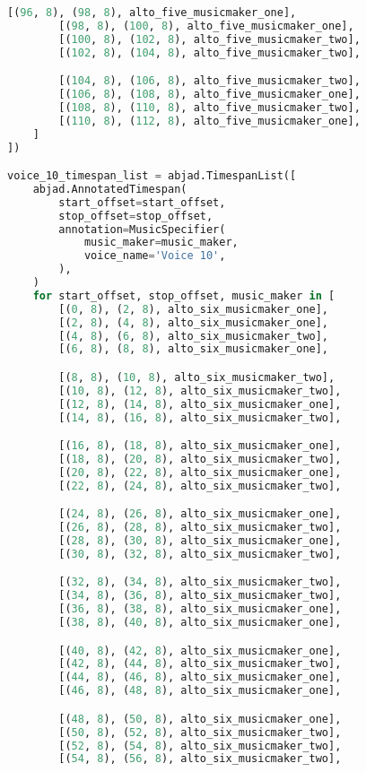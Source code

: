 \begin{lstlisting}[language=Python, caption=Invocation Source Code]
        [(96, 8), (98, 8), alto_five_musicmaker_one],
        [(98, 8), (100, 8), alto_five_musicmaker_one],
        [(100, 8), (102, 8), alto_five_musicmaker_two],
        [(102, 8), (104, 8), alto_five_musicmaker_two],

        [(104, 8), (106, 8), alto_five_musicmaker_two],
        [(106, 8), (108, 8), alto_five_musicmaker_one],
        [(108, 8), (110, 8), alto_five_musicmaker_two],
        [(110, 8), (112, 8), alto_five_musicmaker_one],
    ]
])

voice_10_timespan_list = abjad.TimespanList([
    abjad.AnnotatedTimespan(
        start_offset=start_offset,
        stop_offset=stop_offset,
        annotation=MusicSpecifier(
            music_maker=music_maker,
            voice_name='Voice 10',
        ),
    )
    for start_offset, stop_offset, music_maker in [
        [(0, 8), (2, 8), alto_six_musicmaker_one],
        [(2, 8), (4, 8), alto_six_musicmaker_one],
        [(4, 8), (6, 8), alto_six_musicmaker_two],
        [(6, 8), (8, 8), alto_six_musicmaker_one],

        [(8, 8), (10, 8), alto_six_musicmaker_two],
        [(10, 8), (12, 8), alto_six_musicmaker_two],
        [(12, 8), (14, 8), alto_six_musicmaker_one],
        [(14, 8), (16, 8), alto_six_musicmaker_two],

        [(16, 8), (18, 8), alto_six_musicmaker_one],
        [(18, 8), (20, 8), alto_six_musicmaker_two],
        [(20, 8), (22, 8), alto_six_musicmaker_one],
        [(22, 8), (24, 8), alto_six_musicmaker_two],

        [(24, 8), (26, 8), alto_six_musicmaker_one],
        [(26, 8), (28, 8), alto_six_musicmaker_two],
        [(28, 8), (30, 8), alto_six_musicmaker_one],
        [(30, 8), (32, 8), alto_six_musicmaker_two],

        [(32, 8), (34, 8), alto_six_musicmaker_two],
        [(34, 8), (36, 8), alto_six_musicmaker_two],
        [(36, 8), (38, 8), alto_six_musicmaker_one],
        [(38, 8), (40, 8), alto_six_musicmaker_one],

        [(40, 8), (42, 8), alto_six_musicmaker_one],
        [(42, 8), (44, 8), alto_six_musicmaker_two],
        [(44, 8), (46, 8), alto_six_musicmaker_one],
        [(46, 8), (48, 8), alto_six_musicmaker_one],

        [(48, 8), (50, 8), alto_six_musicmaker_one],
        [(50, 8), (52, 8), alto_six_musicmaker_two],
        [(52, 8), (54, 8), alto_six_musicmaker_two],
        [(54, 8), (56, 8), alto_six_musicmaker_two],


\end{lstlisting}
